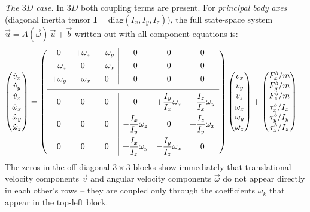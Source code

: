 \emph{The $3D$ case.}
In $3D$ both coupling terms are present. For \emph{principal body axes} (diagonal
inertia tensor $\mathbf{I} = \mathrm{diag}(I_x, I_y, I_z)$), the full state-space
system $\dot{\vec{u}} = A(\vec{\omega})\,\vec{u} + \vec{b}$ written out with all
component equations is:
\begin{align}
    \begin{pmatrix} \dot{v}_x \\ \dot{v}_y \\ \dot{v}_z \\[2pt] \dot{\omega}_x \\
        \dot{\omega}_y \\ \dot{\omega}_z
    \end{pmatrix}
    &= \left(\begin{array}{ccc|ccc}
         0        & +\omega_z & -\omega_y & 0 & 0 & 0 \\[4pt]
        -\omega_z &  0        & +\omega_x & 0 & 0 & 0 \\[4pt]
        +\omega_y & -\omega_x &  0        & 0 & 0 & 0 \\
        \noalign{\vskip6pt}
        \hline\\[-8pt]
        0 & 0 & 0 &                     0 & +\dfrac{I_y}{I_x}\omega_z &
        -\dfrac{I_z}{I_x}\omega_y \\[10pt]
        0 & 0 & 0 & -\dfrac{I_x}{I_y}\omega_z &                     0 &
        +\dfrac{I_z}{I_y}\omega_x \\[10pt]
        0 & 0 & 0 & +\dfrac{I_x}{I_z}\omega_y & -\dfrac{I_y}{I_z}\omega_x &                     0
    \end{array}\right)
    \begin{pmatrix}
        v_x \\ v_y \\ v_z \\[2pt] \omega_x \\ \omega_y \\ \omega_z
    \end{pmatrix} 
    +
    \begin{pmatrix}
        F_x^b/m \\ F_y^b/m \\ F_z^b/m \\[2pt] \tau_x^b/I_x \\ \tau_y^b/I_y \\ \tau_z^b/I_z
    \end{pmatrix}
    \label{eq:newton_euler_3d_full}
\end{align}
The zeros in the off-diagonal $3\times3$ blocks show immediately that translational
velocity components $\vec{v}$ and angular velocity components $\vec{\omega}$ do not appear
directly in each other's rows -- they are coupled only through the coefficients $\omega_k$
that appear in the top-left block.\\

